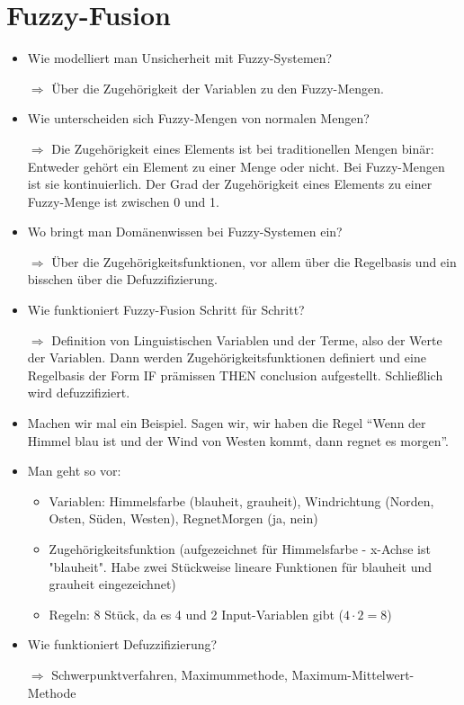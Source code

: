 \documentclass[a4paper]{article}
\begin{document}
    \section{Fuzzy-Fusion}
    \begin{itemize}
        \item Wie modelliert man Unsicherheit mit Fuzzy-Systemen?
        \item[$\Rightarrow$] Über die Zugehörigkeit der Variablen zu den
        Fuzzy-Mengen.
        \item Wie unterscheiden sich Fuzzy-Mengen von normalen Mengen?
        \item[$\Rightarrow$] Die Zugehörigkeit eines Elements ist bei
        traditionellen Mengen binär: Entweder gehört ein Element zu einer Menge
        oder nicht. Bei Fuzzy-Mengen ist sie kontinuierlich. Der Grad der
        Zugehörigkeit eines Elements zu einer Fuzzy-Menge ist zwischen 0 und 1.
        \item Wo bringt man Domänenwissen bei Fuzzy-Systemen ein?
        \item[$\Rightarrow$] Über die Zugehörigkeitsfunktionen, vor allem über
                             die Regelbasis und ein bisschen über die
                             Defuzzifizierung.
        \item Wie funktioniert Fuzzy-Fusion Schritt für Schritt?
        \item[$\Rightarrow$] Definition von Linguistischen Variablen und der
        Terme, also der Werte der Variablen. Dann werden Zugehörigkeitsfunktionen
        definiert und eine Regelbasis der Form IF prämissen THEN conclusion
        aufgestellt. Schließlich wird defuzzifiziert.
        \item Machen wir mal ein Beispiel. Sagen wir, wir haben die Regel
              \enquote{Wenn der Himmel blau ist und der Wind von Westen kommt, dann regnet es morgen}.
        \item Man geht so vor:
        \begin{itemize}
            \item Variablen: Himmelsfarbe (blauheit, grauheit), Windrichtung (Norden, Osten, Süden, Westen), RegnetMorgen (ja, nein)
            \item Zugehörigkeitsfunktion (aufgezeichnet für Himmelsfarbe - x-Achse ist "blauheit". Habe zwei Stückweise lineare Funktionen für blauheit und grauheit eingezeichnet)
            \item Regeln: 8 Stück, da es 4 und 2 Input-Variablen gibt ($4 \cdot 2 = 8$)
        \end{itemize}
        \item Wie funktioniert Defuzzifizierung?
        \item[$\Rightarrow$] Schwerpunktverfahren, Maximummethode, Maximum-Mittelwert-Methode
    \end{itemize}
\end{document}
